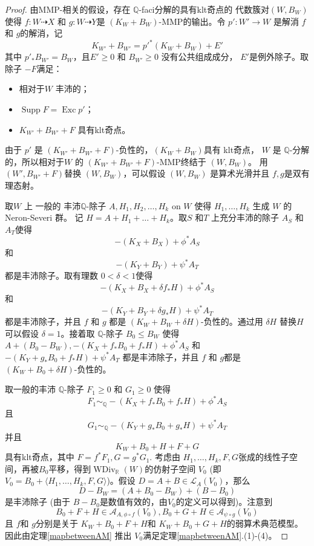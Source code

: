 \begin{proof}
  由MMP-相关的假设，存在 $\mathbb{Q}$-faci分解的具有klt奇点的 代数簇对$(W,B_{W})$ 使得 $f:W\dashrightarrow X$ 和 $g:W \dashrightarrow Y$是 $(K_{W}+B_{W})$-MMP的输出。令 $p':W'\to W$ 是解消 $f$ 和 $g$的解消，记
  \[ K_{W'}+B_{W'}=p'^*(K_{W}+B_{W})+E' \]
  其中  $p'_*B_{W'}=B_{W}$，且$E'\geqslant 0$ 和 $B_{W'}\geqslant 0$ 没有公共组成成分， $E'$是例外除子。取 除子 $-F$满足：
\begin{itemize}
  \item 相对于$W$ 丰沛的；
  \item $\operatorname{Supp}F=\operatorname{Exc}p'$；
  \item  $K_{W'}+B_{W'}+F$ 具有klt奇点。 
\end{itemize}
  由于 $p'$ 是 $(K_{W'}+ B_{W'}+F)$-负性的，$(K_{W}+B_{W})$具有 klt奇点， $W$ 是 $\mathbb{Q}$-分解的，所以相对于$W$ 的 $(K_{W'}+B_{W'}+F)$-MMP终结于 $(W,B_{W})$。 用 $(W',B_{W'} +F)$替换 $(W,B_{W})$，可以假设 $(W,B_{W})$ 是算术光滑并且 $f,g$是双有理态射。 

  取$W$ 上 一般的 丰沛$\mathbb{Q}$-除子 $A, H_{1},H_{2},\ldots ,H_{k}$ on $W$ 使得 $H_{1},\ldots , H_{k}$ 生成 $W$ 的 Neron-Severi 群。 记 $H=A+H_{1}+\ldots+ H_{k}$。取$S$ 和$T$ 上充分丰沛的除子 $A_{S}$ 和 $A_{T}$使得 
  \[ -(K_{X}+B_{X})+\phi^*A_{S} \]
  和
  \[ -(K_{Y}+B_{Y})+\psi^*A_{T} \]
  都是丰沛除子。取有理数 $0<\delta<1$使得 
  \[ -(K_{X}+B_{X}+\delta f_*H)+\phi^*A_{S} \]
  和
  \[-(K_{Y}+B_{Y}+\delta g_*H)+\psi^*A_{T} \]
  都是丰沛除子，并且  $f$ 和  $g$ 都是  $(K_{W}+B_{W}+\delta H)$-负性的。通过用 $\delta H$ 替换$H$可以假设 $\delta=1$。接着取 $\mathbb{Q}$-除子 $B_{0}\leqslant B_{W}$ 使得 $A+(B_{0}-B_{W}), -(K_{X}+ f_*B_{0}+f_*H)+\phi^*A_{S}$ 和 $-(K_{Y}+ g_*B_{0}+f_*H)+\psi^*A_{T}$ 都是丰沛除子，并且 $f$ 和  $g$都是  $(K_{W}+B_{0}+\delta H)$-负性的。

  取一般的丰沛 $\mathbb{Q}$-除子 $F_{1}\geqslant 0$ 和 $G_{1}\geqslant 0$ 使得 
    \[ F_{1}\sim_{\mathbb{Q}} -(K_{X}+f_*B_{0}+ f_*H)+\phi^*A_{S} \]
  且
    \[G_{1}\sim_{\mathbb{Q}} -(K_{Y}+g_*B_{0}+ g_*H)+\psi^*A_{T} \]
  并且
  \[ K_{W}+B_{0}+H+F+G \]
  具有klt奇点，其中 $F=f^*F_{1},G=g^*G_{1}$.
  考虑由 $H_{1},\ldots , H_{k},F,G$张成的线性子空间，再被$B_{0}$平移，得到$\operatorname{WDiv}_{\mathbb{R}}(W)$的仿射子空间 $V_{0}$ (即 $V_{0}=B_{0}+ \langle H_{1},\ldots ,H_{k},F,G \rangle  $)。假设 $D=A+B \in \mathcal{L}_{A}(V_{0})$，那么
  \[ D-B_W=(A+B_{0}-B_{W})+(B-B_{0}) \]
  是丰沛除子 (由于 $B-B_{0}$是数值有效的，由$V_{0}$的定义可以得到)。注意到
  \[ B_{0}+F+H \in \mathcal{A}_{A,\phi\circ f}(V_{0}), B_{0}+G+H \in \mathcal{A}_{\psi \circ g}(V_{0}) \]
  且 $f$和 $g$分别是关于  $K_{W}+B_{0}+F+H$和 $K_{W}+B_{0}+G+H$的弱算术典范模型。因此由定理\ref{mapbetweenAM} 推出 $V_{0}$满足定理\ref{mapbetweenAM}.(1)-(4)。


\end{proof}

